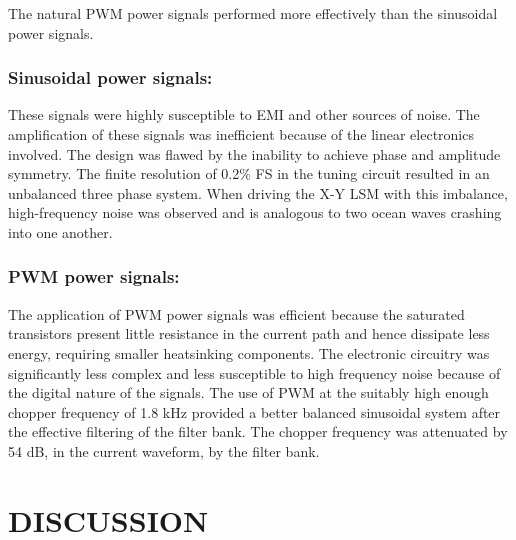 \documentclass[10pt,twocolumn]{witseiepaper}
\begin{document}
The natural PWM power signals performed more effectively than the sinusoidal
power signals.

\subsubsection*{Sinusoidal power signals:}
These signals were highly susceptible to EMI and other sources of noise.  The
amplification of these signals was inefficient because of the linear
electronics involved.  The design was flawed by the inability to achieve phase
and amplitude symmetry.  The finite resolution of 0.2\% FS in the tuning
circuit resulted in an unbalanced three phase system.  When driving the X-Y
LSM with this imbalance, high-frequency noise was observed and is analogous to
two ocean waves crashing into one another.  

\subsubsection*{PWM power signals:}
The application of PWM power signals was efficient because the saturated
transistors present little resistance in the current path and hence dissipate
less energy, requiring smaller heatsinking components.  The electronic
circuitry was significantly less complex and less susceptible to high
frequency noise because of the digital nature of the signals.  The use of PWM
at the suitably high enough chopper frequency of 1.8 kHz provided a better
balanced sinusoidal system after the effective filtering of the filter bank.
The chopper frequency was attenuated by 54 dB, in the current waveform, by the
filter bank.

\section{DISCUSSION}
\end{document}
